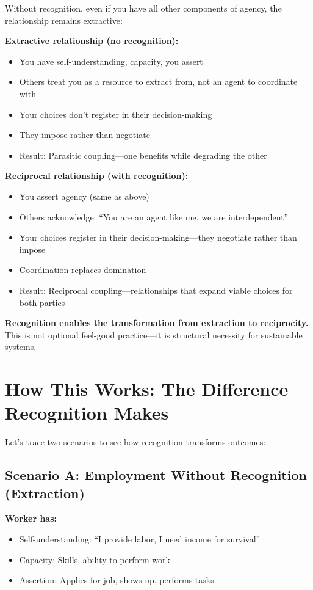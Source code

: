 \documentclass[12pt,a4paper]{article}
\begin{document}
Without recognition, even if you have all other components of agency, the relationship remains extractive:

\textbf{Extractive relationship (no recognition):}
\begin{itemize}
    \item You have self-understanding, capacity, you assert
    \item Others treat you as a resource to extract from, not an agent to coordinate with
    \item Your choices don't register in their decision-making
    \item They impose rather than negotiate
    \item Result: Parasitic coupling—one benefits while degrading the other
\end{itemize}

\textbf{Reciprocal relationship (with recognition):}
\begin{itemize}
    \item You assert agency (same as above)
    \item Others acknowledge: ``You are an agent like me, we are interdependent''
    \item Your choices register in their decision-making—they negotiate rather than impose
    \item Coordination replaces domination
    \item Result: Reciprocal coupling—relationships that expand viable choices for both parties
\end{itemize}

\textbf{Recognition enables the transformation from extraction to reciprocity.} This is not optional feel-good practice—it is structural necessity for sustainable systems.

\section{How This Works: The Difference Recognition Makes}

Let's trace two scenarios to see how recognition transforms outcomes:

\subsection{Scenario A: Employment Without Recognition (Extraction)}

\textbf{Worker has:}
\begin{itemize}
    \item Self-understanding: ``I provide labor, I need income for survival''
    \item Capacity: Skills, ability to perform work
    \item Assertion: Applies for job, shows up, performs tasks
\end{itemize}
\end{document}
